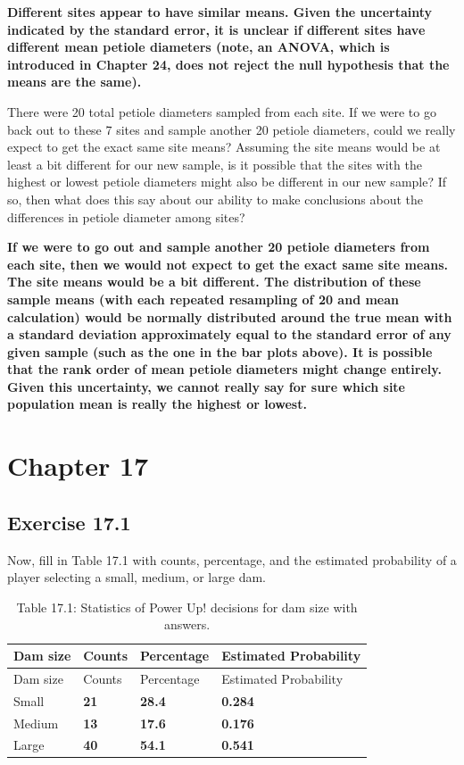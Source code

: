 \documentclass[
  openany]{krantz}
\begin{document}
\textbf{Different sites appear to have similar means. Given the uncertainty indicated by the standard error, it is unclear if different sites have different mean petiole diameters (note, an ANOVA, which is introduced in Chapter 24, does not reject the null hypothesis that the means are the same).}

There were 20 total petiole diameters sampled from each site. If we were to go back out to these 7 sites and sample another 20 petiole diameters, could we really expect to get the exact same site means? Assuming the site means would be at least a bit different for our new sample, is it possible that the sites with the highest or lowest petiole diameters might also be different in our new sample? If so, then what does this say about our ability to make conclusions about the differences in petiole diameter among sites?

\textbf{If we were to go out and sample another 20 petiole diameters from each site, then we would not expect to get the exact same site means. The site means would be a bit different. The distribution of these sample means (with each repeated resampling of 20 and mean calculation) would be normally distributed around the true mean with a standard deviation approximately equal to the standard error of any given sample (such as the one in the bar plots above). It is possible that the rank order of mean petiole diameters might change entirely. Given this uncertainty, we cannot really say for sure which site population mean is really the highest or lowest.}

\hypertarget{chapter-17}{%
\section{Chapter 17}\label{chapter-17}}

\hypertarget{exercise-17.1}{%
\subsection{Exercise 17.1}\label{exercise-17.1}}

Now, fill in Table 17.1 with counts, percentage, and the estimated probability of a player selecting a small, medium, or large dam.

\begin{longtable}[]{@{}llll@{}}
\caption{Table 17.1: Statistics of Power Up! decisions for dam size with answers.}\tabularnewline
\toprule
Dam size & Counts & Percentage & Estimated Probability \\
\midrule
\endfirsthead
\toprule
Dam size & Counts & Percentage & Estimated Probability \\
\midrule
\endhead
Small & \textbf{21} & \textbf{28.4} & \textbf{0.284} \\
Medium & \textbf{13} & \textbf{17.6} & \textbf{0.176} \\
Large & \textbf{40} & \textbf{54.1} & \textbf{0.541} \\
\bottomrule
\end{longtable}
\end{document}
